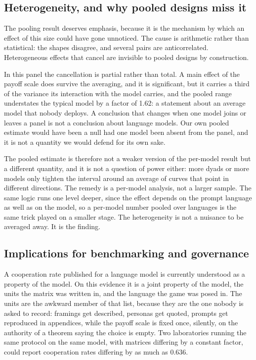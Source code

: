 \documentclass[openacc]{rsproca_new}
\begin{document}
\subsection{Heterogeneity, and why pooled designs miss it}\label{sec:disc_pooling}

The pooling result deserves emphasis, because it is the mechanism by which an
effect of this size could have gone unnoticed. The cause is arithmetic rather
than statistical: the shapes disagree, and several pairs are anticorrelated.
Heterogeneous effects that cancel are invisible to pooled designs by
construction.

In this panel the cancellation is partial rather than total. A main effect of
the payoff scale does survive the averaging, and it is significant, but it
carries a third of the variance its interaction with the model carries, and the
pooled range understates the typical model by a factor of 1.62: a statement
about an average model that nobody deploys. A conclusion that changes when one
model joins or leaves a panel is not a conclusion about language models. Our
own pooled estimate would have been a null had one model been absent from the
panel, and it is not a quantity we would defend for its own sake.

The pooled estimate is therefore not a weaker version of the per-model result
but a different quantity, and it is not a question of power either: more dyads
or more models only tighten the interval around an average of curves that point
in different directions. The remedy is a per-model analysis, not a larger
sample. The same logic runs one level deeper, since the effect depends on the
prompt language as well as on the model, so a per-model number pooled over
languages is the same trick played on a smaller stage. The heterogeneity is not
a nuisance to be averaged away. It is the finding.

\subsection{Implications for benchmarking and governance}\label{sec:disc_benchmarking}

A cooperation rate published for a language model is currently understood as a
property of the model. On this evidence it is a joint property of the model,
the units the matrix was written in, and the language the game was posed in.
The units are the awkward member of that list, because they are the one nobody
is asked to record: framings get described, personas get quoted, prompts get
reproduced in appendices, while the payoff scale is fixed once, silently, on
the authority of a theorem saying the choice is empty. Two laboratories running
the same protocol on the same model, with matrices differing by a constant
factor, could report cooperation rates differing by as much as 0.636.
\end{document}
